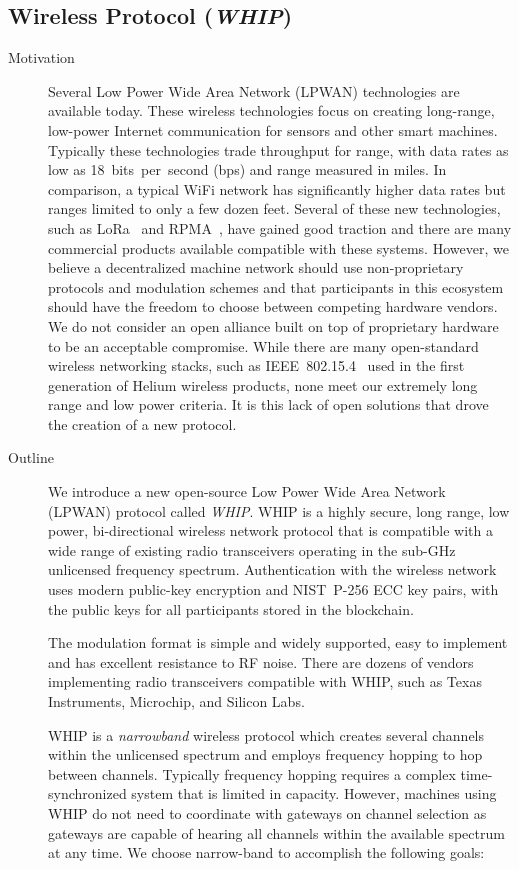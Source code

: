 \documentclass[10pt, nonatbib, nocopyrightspace, reprint]{sigplanconf}
\begin{document}
\subsection{Wireless Protocol (\emph{WHIP})}\label{whip}

\begin{description}
    \item [Motivation] Several Low Power Wide Area Network (LPWAN) technologies are available today. These wireless technologies focus on creating long-range, low-power Internet communication for sensors and other smart machines. Typically these technologies trade throughput for range, with data rates as low as 18~bits~per~second (bps) and range measured in miles. In comparison, a typical WiFi network has significantly higher data rates but ranges limited to only a few dozen feet. Several of these new technologies, such as LoRa~\cite{lora} and RPMA~\cite{rpma}, have gained good traction and there are many commercial products available compatible with these systems. However, we believe a decentralized machine network should use non-proprietary protocols and modulation schemes and that participants in this ecosystem should have the freedom to choose between competing hardware vendors. We do not consider an open alliance built on top of proprietary hardware to be an acceptable compromise. While there are many open-standard wireless networking stacks, such as IEEE~802.15.4~\cite{ieee802_15_4} used in the first generation of Helium wireless products, none meet our extremely long range and low power criteria. It is this lack of open solutions that drove the creation of a new protocol.

    \item [Outline] We introduce a new open-source Low Power Wide Area Network (LPWAN) protocol called \emph{WHIP}. WHIP is a highly secure, long range, low power, bi-directional wireless network protocol that is compatible with a wide range of existing radio transceivers operating in the sub-GHz unlicensed frequency spectrum. Authentication with the wireless network uses modern public-key encryption and NIST~P-256 ECC key pairs, with the public keys for all participants stored in the blockchain.

    The modulation format is simple and widely supported, easy to implement and has excellent resistance to RF noise. There are dozens of vendors implementing radio transceivers compatible with WHIP, such as Texas Instruments, Microchip, and Silicon Labs.

    WHIP is a \emph{narrowband} wireless protocol which creates several channels within the unlicensed spectrum and employs frequency hopping to hop between channels. Typically frequency hopping requires a complex time-synchronized system that is limited in capacity. However, machines using WHIP do not need to coordinate with gateways on channel selection as gateways are capable of hearing all channels within the available spectrum at any time. We choose narrow-band to accomplish the following goals:


\end{description}
\end{document}
